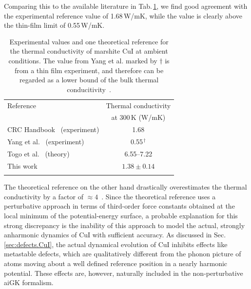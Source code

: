 Comparing this to the available literature in Tab.\,\ref{tab:exp.CuI}, we find good agreement with the  experimental reference value of 1.68\,W/mK, while the value is clearly above the thin-film limit of 0.55\,W/mK.
\begin{table}[ht]
  \centering
  \selectfont
  \begin{tabular}{lc}
    \toprule
    Reference & Thermal conductivity \\
    & at 300\,K (W/mK) \\
    \midrule
    CRC Handbook~\cite{perry2016} (experiment) & 1.68 \\
    Yang et al.~\cite{yang2017} (experiment) &  0.55$^{\,\dagger}$ \\
    Togo et al.~\cite{phono3py} (theory) & 6.55--7.22 \\
    This work & $1.38 \pm 0.14$ \\
    \bottomrule
    \vspace{.5em}
  \end{tabular}
  \caption{Experimental values and one theoretical reference for the thermal conductivity of marshite CuI at ambient conditions. The value from Yang et al. marked by $\dagger$ is from a thin film experiment, and therefore can be regarded as a lower bound of the bulk thermal conducitivity~\cite{yang2017}.}
  \label{tab:exp.CuI}
\end{table}
The theoretical reference on the other hand drastically overestimates the thermal conductivity by a factor of $\approx 4$~\cite{phono3py}. Since the theoretical reference uses a perturbative approach in terms of third-order force constants obtained at the local minimum of the potential-energy surface, a probable explanation for this strong discrepancy is the inability of this approach to model the actual, strongly anharmonic dynamics of CuI with sufficient accuracy. As discussed in Sec.\,\ref{sec:defects.CuI}, the actual dynamical evolution of CuI inhibits effects like metastable defects, which are qualitatively different from the phonon picture of atoms moving about a well defined reference position in a nearly harmonic potential. These effects are, however, naturally included in the non-perturbative aiGK formalism.

